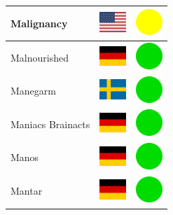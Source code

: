 \documentclass[12pt, a4paper, twoside]{report}
\begin{document}
\begin{center}
\begin{longtable}{|p{5cm}|p{2cm}|p{2cm}|}
 Malignancy                                                 & \includegraphics[width=1cm]{../img/flags/us} &   \includegraphics[width=1cm]{../likes/m} \\ \hline
 Malnourished                                               & \includegraphics[width=1cm]{../img/flags/de} &   \includegraphics[width=1cm]{../likes/y} \\ \hline
 Manegarm                                                   & \includegraphics[width=1cm]{../img/flags/se} &   \includegraphics[width=1cm]{../likes/y} \\ \hline
 Maniacs Brainacts                                          & \includegraphics[width=1cm]{../img/flags/de} &   \includegraphics[width=1cm]{../likes/y} \\ \hline
 Manos                                                      & \includegraphics[width=1cm]{../img/flags/de} &   \includegraphics[width=1cm]{../likes/y} \\ \hline
 Mantar                                                     & \includegraphics[width=1cm]{../img/flags/de} &   \includegraphics[width=1cm]{../likes/y} \\ \hline

\end{longtable}
\end{center}
\end{document}
